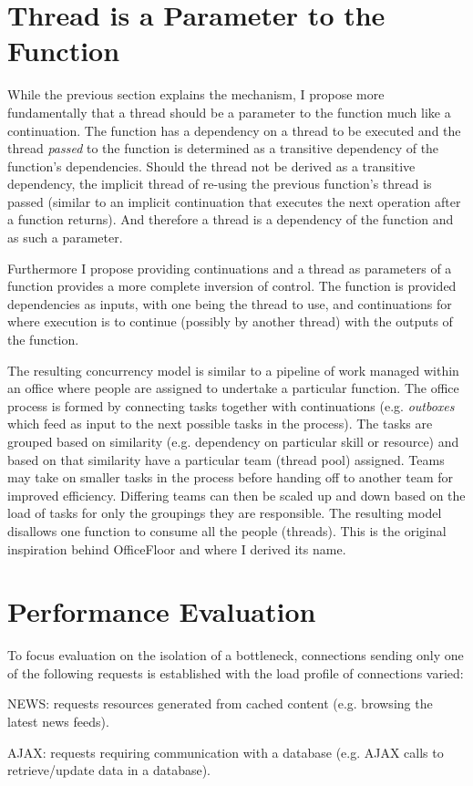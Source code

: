 \documentclass[conference]{ieee/IEEEtran}
\begin{document}
\section{Thread is a Parameter to the Function}
While the previous section explains the mechanism, I propose more fundamentally
that a thread should be a parameter to the function much like a continuation.
The function has a dependency on a thread to be executed and the thread
\textit{passed} to the function is determined as a transitive dependency of the
function's dependencies.  Should the thread not be derived as a transitive
dependency, the implicit thread of re-using the previous function's thread is
passed (similar to an implicit continuation that executes the next operation
after a function returns).  And therefore a thread is a dependency of the
function and as such a parameter.

Furthermore I propose providing continuations and a thread as parameters of a
function provides a more complete inversion of control.  The function is
provided dependencies as inputs, with one being the thread to use, and
continuations for where execution is to continue (possibly by another thread)
with the outputs of the function.

The resulting concurrency model is similar to a pipeline of work managed within
an office where people are assigned to undertake a particular function.
The office process is formed by connecting tasks together with continuations
(e.g. \textit{outboxes} which feed as input to the next possible tasks in the
process).  The tasks are grouped based on similarity (e.g. dependency on
particular skill or resource) and based on that similarity have a particular
team (thread pool) assigned.  Teams may take on smaller tasks in the process
before handing off to another team for improved efficiency.  Differing teams can
then be scaled up and down based on the load of tasks for only the groupings
they are responsible.  The resulting model disallows one function to consume all
the people (threads).  This is the original inspiration behind OfficeFloor and
where I derived its name.



\section{Performance Evaluation}
To focus evaluation on the isolation of a bottleneck, connections sending only
one of the following requests is established with the load profile of
connections varied:
\begin{IEEEitemize}
\item NEWS: requests resources generated from cached content (e.g. browsing the
latest news feeds).
\item AJAX: requests requiring communication with a database (e.g. AJAX calls to
retrieve/update data in a database).
\end{IEEEitemize}
\end{document}
